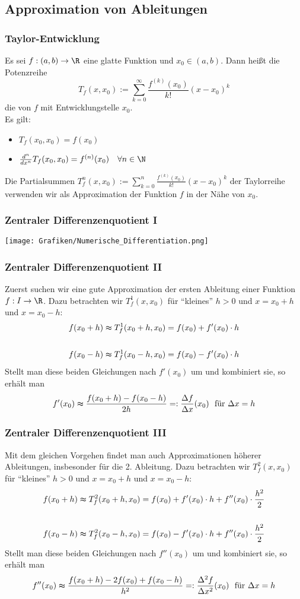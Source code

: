 \subsection{Approximation von Ableitungen}
%
\begin{frame}\frametitle{Taylor-Entwicklung}
Es sei $f: (a,b) \to \R$ eine glatte Funktion und $x_0 \in (a,b)$. Dann heißt die Potenzreihe
$$
T_f(x,x_0):=\sum_{k=0}^\infty \frac{f^{(k)}(x_0)}{k!}(x-x_0)^k
$$
die  von $f$ mit Entwicklungstelle $x_0$.\\[5mm]	

Es gilt:
\begin{itemize}
\item $T_f(x_0,x_0)=f(x_0)$
\item $\frac{d^n}{dx^n}T_f(x_0,x_0)=f^{(n)}(x_0) \quad \forall n \in \N$
\end{itemize}\vfill 
Die Partialsummen $T^n_f(x,x_0):=\sum_{k=0}^n \frac{f^{(k)}(x_0)}{k!}(x-x_0)^k$ der Taylorreihe verwenden wir als Approximation der Funktion $f$ in der Nähe von $x_0$.

\end{frame}
%
%
\begin{frame}\frametitle{Zentraler Differenzenquotient I}
\texttt{[image: Grafiken/Numerische\_Differentiation.png]}

\end{frame}
%
%
\begin{frame}\frametitle{Zentraler Differenzenquotient II}
Zuerst suchen wir eine gute Approximation der ersten Ableitung einer Funktion $f:I \to \R$. Dazu betrachten wir $T^1_f(x,x_0)$ für ``kleines'' $h>0$ und $x=x_0+h$ und $x=x_0-h$:
\begin{align*}
f(x_0+h) &\thickapprox T^1_f(x_0+h,x_0)=f(x_0)+f'(x_0)\cdot h\\
&\\
f(x_0-h) &\thickapprox T^1_f(x_0-h,x_0)=f(x_0)-f'(x_0)\cdot h
\end{align*}
Stellt man diese beiden Gleichungen nach $f'(x_0)$ um und kombiniert sie, so erhält man
$$
f'(x_0) \thickapprox \frac{f(x_0+h)-f(x_0-h)}{2h} =:\frac{\Delta f}{\Delta x}(x_0)  \ \text{ für } \Delta x=h
$$
\end{frame}
%
%
\begin{frame}\frametitle{Zentraler Differenzenquotient III}
Mit dem gleichen Vorgehen findet man auch Approximationen höherer Ableitungen, insbesonder für die 2. Ableitung. Dazu betrachten wir $T^2_f(x,x_0)$ für ``kleines'' $h>0$ und $x=x_0+h$ und $x=x_0-h$:
\begin{align*}
f(x_0+h) &\thickapprox T^2_f(x_0+h,x_0)=f(x_0)+f'(x_0)\cdot h+f''(x_0)\cdot \frac{h^2}{2}\\
&\\
f(x_0-h) &\thickapprox T^2_f(x_0-h,x_0)=f(x_0)-f'(x_0)\cdot h +f''(x_0)\cdot \frac{h^2}{2}
\end{align*}
Stellt man diese beiden Gleichungen nach $f''(x_0)$ um und kombiniert sie, so erhält man
$$
f''(x_0) \thickapprox \frac{f(x_0+h)-2f(x_0)+f(x_0-h)}{h^2}=:\frac{\Delta^2 f}{\Delta x^2}(x_0) \ \text{ für } \Delta x=h
$$
\end{frame}
%
%
